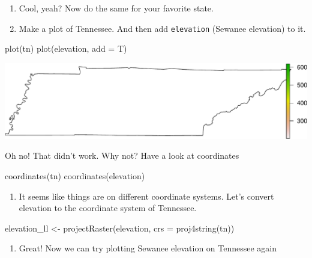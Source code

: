 \documentclass[
]{book}
\newenvironment{Shaded}{\begin{snugshade}}{\end{snugshade}}
\newcommand{\AttributeTok}[1]{\textcolor[rgb]{0.77,0.63,0.00}{#1}}
\newcommand{\FunctionTok}[1]{\textcolor[rgb]{0.00,0.00,0.00}{#1}}
\newcommand{\NormalTok}[1]{#1}
\newcommand{\OtherTok}[1]{\textcolor[rgb]{0.56,0.35,0.01}{#1}}
\providecommand{\tightlist}{%
  \setlength{\itemsep}{0pt}\setlength{\parskip}{0pt}}
\begin{document}
\begin{enumerate}
\def\labelenumi{\arabic{enumi}.}
\setcounter{enumi}{15}
\item
  Cool, yeah? Now do the same for your favorite state.
\item
  Make a plot of Tennessee. And then add \texttt{elevation} (Sewanee elevation) to it.
\end{enumerate}

\begin{Shaded}
\begin{Highlighting}[]
\FunctionTok{plot}\NormalTok{(tn)}
\FunctionTok{plot}\NormalTok{(elevation, }\AttributeTok{add =}\NormalTok{ T)}
\end{Highlighting}
\end{Shaded}

\includegraphics{figures/unnamed-chunk-424-1.pdf}

Oh no! That didn't work. Why not? Have a look at coordinates

\begin{Shaded}
\begin{Highlighting}[]
\FunctionTok{coordinates}\NormalTok{(tn)}
\FunctionTok{coordinates}\NormalTok{(elevation)}
\end{Highlighting}
\end{Shaded}

\begin{enumerate}
\def\labelenumi{\arabic{enumi}.}
\setcounter{enumi}{17}
\tightlist
\item
  It seems like things are on different coordinate systems. Let's convert elevation to the coordinate system of Tennessee.
\end{enumerate}

\begin{Shaded}
\begin{Highlighting}[]
\NormalTok{elevation\_ll }\OtherTok{\textless{}{-}} \FunctionTok{projectRaster}\NormalTok{(elevation, }\AttributeTok{crs =} \FunctionTok{proj4string}\NormalTok{(tn))}
\end{Highlighting}
\end{Shaded}

\begin{enumerate}
\def\labelenumi{\arabic{enumi}.}
\setcounter{enumi}{18}
\tightlist
\item
  Great! Now we can try plotting Sewanee elevation on Tennessee again
\end{enumerate}
\end{document}
